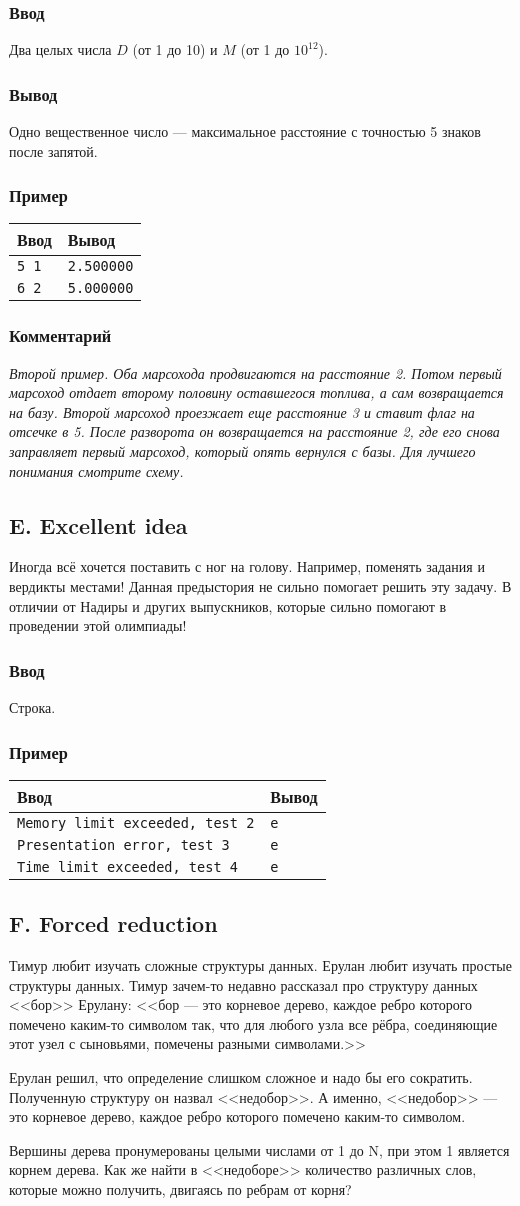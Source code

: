 \documentclass[10pt, a4paper]{article}
\newcommand{\informat}[1]
{
	\subsubsection*{Ввод} #1
}
\newcommand{\outformat}[1]
{
	\subsubsection*{Вывод} #1
}
\newcommand{\examplee}[4]
{
	\subsubsection*{Пример}
	\noindent
	\begin{center}
	\begin{tabularx}{\linewidth}{|X|X|}
	\hline
	Ввод 	& Вывод  	\\
	\hline
	{\tt #1} & {\tt #2}	\\
	\hline
	{\tt #3} & {\tt #4}	\\
	\hline
	\end{tabularx}
	\end{center}
}
\newcommand{\exampleee}[6]
{
	\subsubsection*{Пример}
	\noindent
	\begin{center}
	\begin{tabularx}{\linewidth}{|X|X|}
	\hline
	Ввод 	& Вывод  	\\
	\hline
	{\tt #1} & {\tt #2}	\\
	\hline
	{\tt #3} & {\tt #4}	\\
	\hline
	{\tt #5} & {\tt #6}	\\
	\hline
	\end{tabularx}
	\end{center}
}
\newcommand{\excomm}[1]
{
	\subsubsection*{Комментарий}
	\textit{#1}
}
\begin{document}
\informat{Два целых числа $D$ (от 1 до 10) и $M$ (от 1 до $10^{12}$).}

\outformat{Одно вещественное число --- максимальное расстояние с точностью 5 знаков после запятой.}

\examplee{5 1}{2.500000}{6 2}{5.000000}

\excomm{Второй пример. Оба марсохода продвигаются на расстояние 2. Потом первый марсоход отдает второму половину оставшегося топлива, а сам возвращается на базу. Второй марсоход проезжает еще расстояние 3 и ставит флаг на отсечке в 5. После разворота он возвращается на расстояние 2, где его снова заправляет первый марсоход, который опять вернулся с базы. Для лучшего понимания смотрите схему.}





\subsection*{E. Excellent idea}
 


Иногда всё хочется поставить с ног на голову. Например, поменять задания и вердикты местами! Данная предыстория не сильно помогает решить эту задачу. В отличии от Надиры и других выпускников, которые сильно помогают в проведении этой олимпиады!

\informat{Строка.}

\exampleee{Memory limit exceeded, test 2}{e}{Presentation error, test 3}{e}{Time limit exceeded, test 4}{e}




\subsection*{F. Forced reduction}
 

Тимур любит изучать сложные структуры данных. Ерулан любит изучать простые структуры данных. Тимур зачем-то недавно рассказал про структуру данных <<бор>> Ерулану: <<бор --- это корневое дерево, каждое ребро которого помечено каким-то символом так, что для любого узла все рёбра, соединяющие этот узел с сыновьями, помечены разными символами.>>

Ерулан решил, что определение слишком сложное и надо бы его сократить. Полученную структуру он назвал <<недобор>>. А именно, <<недобор>> --- это корневое дерево, каждое ребро которого помечено каким-то символом.

Вершины дерева пронумерованы целыми числами от 1 до N, при этом 1 является корнем дерева. Как же найти в <<недоборе>> количество различных слов, которые можно получить, двигаясь по ребрам от корня? 
\end{document}
